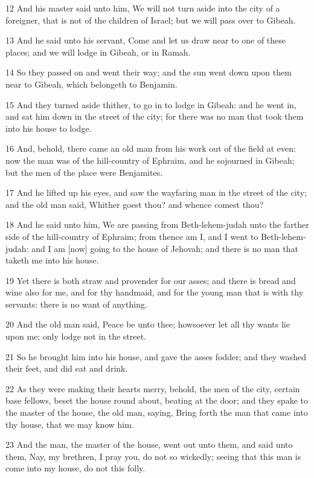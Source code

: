 \par 12 And his master said unto him, We will not turn aside into the city of a foreigner, that is not of the children of Israel; but we will pass over to Gibeah.
\par 13 And he said unto his servant, Come and let us draw near to one of these places; and we will lodge in Gibeah, or in Ramah.
\par 14 So they passed on and went their way; and the sun went down upon them near to Gibeah, which belongeth to Benjamin.
\par 15 And they turned aside thither, to go in to lodge in Gibeah: and he went in, and sat him down in the street of the city; for there was no man that took them into his house to lodge.
\par 16 And, behold, there came an old man from his work out of the field at even: now the man was of the hill-country of Ephraim, and he sojourned in Gibeah; but the men of the place were Benjamites.
\par 17 And he lifted up his eyes, and saw the wayfaring man in the street of the city; and the old man said, Whither goest thou? and whence comest thou?
\par 18 And he said unto him, We are passing from Beth-lehem-judah unto the farther side of the hill-country of Ephraim; from thence am I, and I went to Beth-lehem-judah: and I am [now] going to the house of Jehovah; and there is no man that taketh me into his house.
\par 19 Yet there is both straw and provender for our asses; and there is bread and wine also for me, and for thy handmaid, and for the young man that is with thy servants: there is no want of anything.
\par 20 And the old man said, Peace be unto thee; howsoever let all thy wants lie upon me; only lodge not in the street.
\par 21 So he brought him into his house, and gave the asses fodder; and they washed their feet, and did eat and drink.
\par 22 As they were making their hearts merry, behold, the men of the city, certain base fellows, beset the house round about, beating at the door; and they spake to the master of the house, the old man, saying, Bring forth the man that came into thy house, that we may know him.
\par 23 And the man, the master of the house, went out unto them, and said unto them, Nay, my brethren, I pray you, do not so wickedly; seeing that this man is come into my house, do not this folly.
